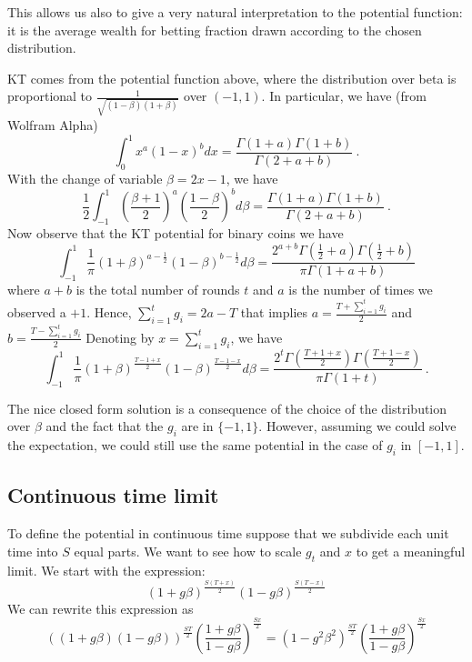 \documentclass{article}
\begin{document}
This allows us also to give a very natural interpretation to the potential function: it is the average wealth for betting fraction drawn according to the chosen distribution.

KT comes from the potential function above, where the distribution over beta is proportional to $\frac{1}{\sqrt{(1-\beta)(1+\beta)}}$ over $(-1,1)$. 
In particular, we have (from Wolfram Alpha)
\[
\int_0^1 x^a (1-x)^b dx
= \frac{\Gamma(1 + a) \Gamma(1 + b)}{\Gamma(2 + a + b)}~.
\]
With the change of variable $\beta=2x-1$, we have
\[
\frac{1}{2}\int_{-1}^1 \left(\frac{\beta+1}{2}\right)^a \left(\frac{1-\beta}{2}\right)^b d\beta
= \frac{\Gamma(1 + a) \Gamma(1 + b)}{\Gamma(2 + a + b)}~.
\]
Now observe that the KT potential for binary coins we have
\[
\int_{-1}^1 \frac{1}{\pi} (1+\beta)^{a-\frac{1}{2}} (1-\beta)^{b-\frac{1}{2}} d\beta
= \frac{2^{a+b} \Gamma(\frac{1}{2} + a) \Gamma(\frac{1}{2} + b)}{  \pi \Gamma(1 + a + b)}
\]
where $a+b$ is the total number of rounds $t$ and $a$ is the number of times we observed a $+1$. Hence, $\sum_{i=1}^t g_i= 2a-T$ that implies $a=\frac{T+\sum_{i=1}^t g_i}{2}$ and $b=\frac{T-\sum_{i=1}^t g_i}{2}$
Denoting by $x=\sum_{i=1}^t g_i$, we have
\[
\int_{-1}^1 \frac{1}{\pi} (1+\beta)^{\frac{T-1+x}{2}} (1-\beta)^{\frac{T-1-x}{2}} d\beta
= \frac{2^{t} \Gamma(\frac{T+1+x}{2}) \Gamma(\frac{T+1-x}{2})}{  \pi \Gamma(1 + t)}~.
\]

The nice closed form solution is a consequence of the choice of the distribution over $\beta$ and the fact that the $g_i$ are in $\{-1,1\}$. However, assuming we could solve the expectation, we could still use the same potential in the case of $g_i$ in $[-1,1]$. 


\subsection{Continuous time limit}
To define the potential in continuous time suppose that we subdivide each unit time
into $S$ equal parts. We want to see how to scale $g_t$ and $x$ to get a meaningful limit. We start with the expression:
$$ (1+g\beta)^{\frac{S(T+x)}{2}} (1-g\beta)^{\frac{S(T-x)}{2}} $$
We can rewrite this expression as
$$ ((1+g\beta)(1-g\beta))^{\frac{ST}{2}} \left( \frac{1+g\beta}{1-g \beta}\right)^{\frac{Sx}{2}}
=
(1-g^2 \beta^2)^{\frac{ST}{2}} \left( \frac{1+g\beta}{1-g \beta}\right)^{\frac{Sx}{2}}
$$
\end{document}
